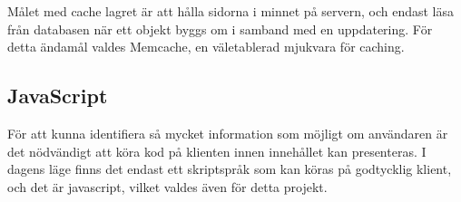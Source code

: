 Målet med cache lagret är att hålla sidorna i minnet på servern, och endast läsa från databasen när ett objekt byggs om i samband med en uppdatering. För detta ändamål valdes Memcache, en väletablerad mjukvara för caching.

\subsection{JavaScript}

För att kunna identifiera så mycket information som möjligt om användaren är det nödvändigt att köra kod på klienten innen innehållet kan presenteras. I dagens läge finns det endast ett skriptspråk som kan köras på godtycklig klient, och det är javascript, vilket valdes även för detta projekt. 

